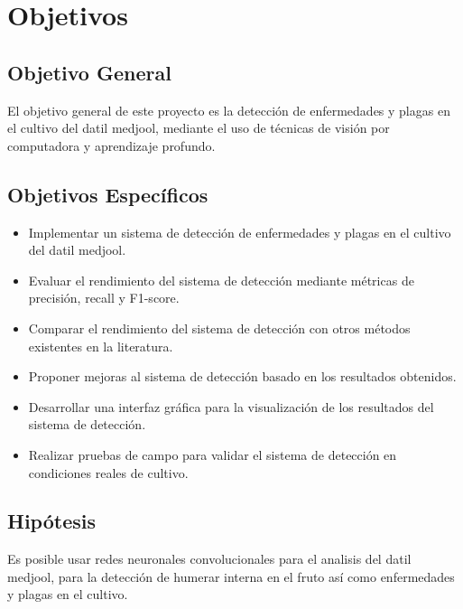 
\chapter{Objetivos} %

\label{Chapter2} %


\section{Objetivo General}

El objetivo general de este proyecto es la detección de enfermedades y plagas en el cultivo del datil medjool, mediante el uso de técnicas de visión por computadora y aprendizaje profundo.\\


\section{Objetivos Específicos}

\begin{itemize}
    \item Implementar un sistema de detección de enfermedades y plagas en el cultivo del datil medjool.
    \item Evaluar el rendimiento del sistema de detección mediante métricas de precisión, recall y F1-score.
    \item Comparar el rendimiento del sistema de detección con otros métodos existentes en la literatura.
    \item Proponer mejoras al sistema de detección basado en los resultados obtenidos.
    \item Desarrollar una interfaz gráfica para la visualización de los resultados del sistema de detección.
    \item Realizar pruebas de campo para validar el sistema de detección en condiciones reales de cultivo.
\end{itemize}


\section{Hipótesis}

Es posible usar redes neuronales convolucionales para el analisis del datil medjool, para la detección de humerar interna en el fruto así como enfermedades y plagas en el cultivo.\\


